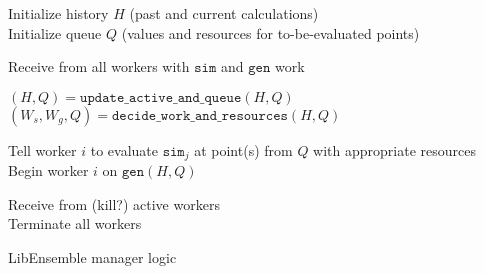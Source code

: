 \documentclass{article}
\begin{document}
\newpage
\LinesNumbered
\begin{algorithm}[t] %
  Initialize history $H$ (past and current calculations)\\
  Initialize queue $Q$ (values and resources for to-be-evaluated points) 

  {
    {
      Receive from all workers with $\mathtt{sim}$ and $\mathtt{gen}$ work\\
    }

    $(H,Q) = \mathtt{update\_active\_and\_queue}(H,Q)$
    $(W_s, W_g, Q) = \mathtt{decide\_work\_and\_resources}(H,Q)$

    {
      {
      Tell worker $i$ to evaluate $\mathtt{sim}_j$ at point(s) from $Q$ with appropriate resources
      }{
      Begin worker $i$ on $\mathtt{gen}(H,Q)$\\
      }
    }
  }
  Receive from (kill?) active workers\\ 
  Terminate all workers
  \caption{LibEnsemble manager logic \label{alg:manager}} 
\end{algorithm}
\end{document}
